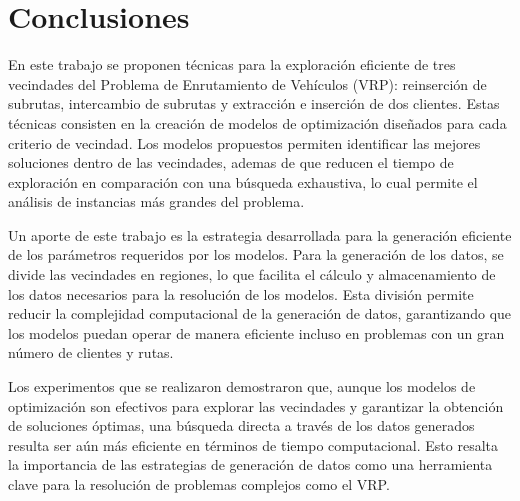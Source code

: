 \documentclass[12pt]{report}
\begin{document}
	\chapter*{Conclusiones}
	\label{Conclusiones}

	En este trabajo se proponen técnicas para la exploración eficiente de tres vecindades del Problema de Enrutamiento de Vehículos (VRP): reinserción de subrutas, intercambio de subrutas y extracción e inserción de dos clientes. Estas técnicas consisten en la creación de modelos de optimización diseñados para cada criterio de vecindad. Los modelos propuestos permiten identificar las mejores soluciones dentro de las vecindades, ademas de que reducen el tiempo de exploración en comparación con una búsqueda exhaustiva, lo cual permite el análisis de instancias más grandes del problema.

	Un aporte de este trabajo es la estrategia desarrollada para la generación eficiente de los parámetros requeridos por los modelos. Para la generación de los datos, se divide las vecindades en regiones, lo que facilita el cálculo y almacenamiento de los datos necesarios para la resolución de los modelos. Esta división permite reducir la complejidad computacional de la generación de datos, garantizando que los modelos puedan operar de manera eficiente incluso en problemas con un gran número de clientes y rutas.

	Los experimentos que se realizaron demostraron que, aunque los modelos de optimización son efectivos para explorar las vecindades y garantizar la obtención de soluciones óptimas, una búsqueda directa a través de los datos generados resulta ser aún más eficiente en términos de tiempo computacional. Esto resalta la importancia de las estrategias de generación de datos como una herramienta clave para la resolución de problemas complejos como el VRP.
\end{document}
